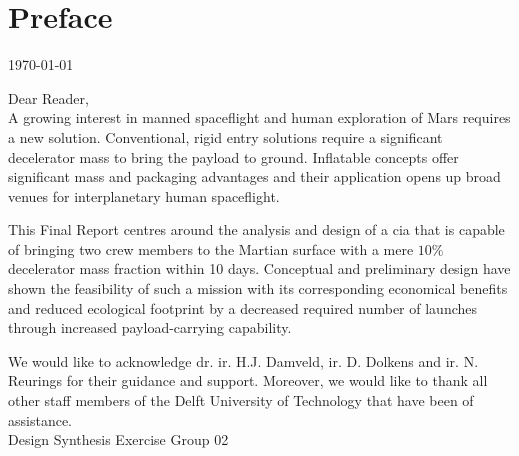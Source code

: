 \section*{Preface}\label{cha:preface}

\begin{flushright}
	\today
\end{flushright}

Dear Reader,	
\\ [1cm]
A growing interest in manned spaceflight and human exploration of Mars requires a new solution. Conventional, rigid entry solutions require a significant decelerator mass to bring the payload to ground. Inflatable concepts offer significant mass and packaging advantages and their application opens up broad venues for interplanetary human spaceflight. 

This Final Report centres around the analysis and design of a \acrlong{cia} that is capable of bringing two crew members to the Martian surface with a mere $10\%$ decelerator mass fraction within 10 days. Conceptual and preliminary design have shown the feasibility of such a mission with its corresponding economical benefits and reduced ecological footprint by a decreased required number of launches through increased payload-carrying capability.

We would like to acknowledge dr. ir. H.J. Damveld, ir. D. Dolkens and ir. N. Reurings for their guidance and support. Moreover, we would like to thank all other staff members of the Delft University of Technology that have been of assistance.
\\ [1.5cm]
Design Synthesis Exercise Group 02
